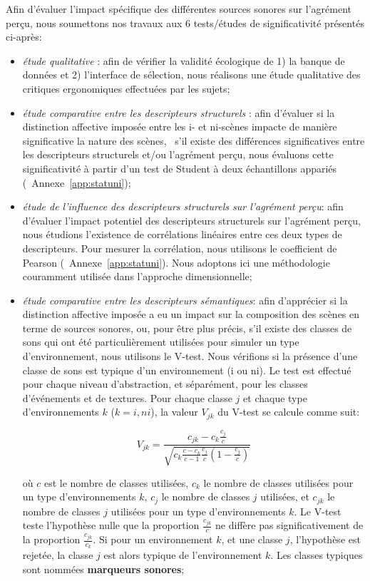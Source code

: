 Afin d'évaluer l'impact spécifique des différentes sources sonores sur l'agrément perçu, nous soumettons nos travaux aux 6 tests/études de significativité présentés ci-après:

\begin{itemize}
\item \emph{étude qualitative} : afin de vérifier la validité écologique de 1) la banque de données et 2) l'interface de sélection, nous réalisons une étude qualitative des critiques ergonomiques effectuées par les sujets;
\item \emph{étude comparative entre les descripteurs structurels} : afin d'évaluer si la distinction affective imposée entre les i- et ni-scènes impacte de manière significative la nature des scènes, \ie~s'il existe des différences significatives entre les descripteurs structurels et/ou l'agrément perçu, nous évaluons cette significativité à partir d'un test de Student à deux échantillons appariés (\cf~Annexe~\ref{app:statuni});
\item \emph{étude de l'influence des descripteurs structurels sur l'agrément perçu}: afin d'évaluer l'impact potentiel des descripteurs structurels sur l'agrément perçu, nous étudions l'existence de corrélations linéaires entre ces deux types de descripteurs. Pour mesurer la corrélation, nous utilisons le coefficient de Pearson (\cf~Annexe~\ref{app:statuni}). Nous adoptons ici une méthodologie couramment utilisée dans l'approche dimensionnelle;
\item \emph{étude comparative entre les descripteurs sémantiques}: afin d'apprécier si la distinction affective imposée a eu un impact sur la composition des scènes en terme de sources sonores, ou, pour être plus précis, s'il existe des classes de sons qui ont été particulièrement utilisées pour simuler un type d'environnement, nous utilisons le V-test. Nous vérifions si la présence d'une classe de sons est typique d'un environnement (i ou ni). Le test est effectué pour chaque niveau d'abstraction, et séparément, pour les classes d'événements et de textures. Pour chaque classe $j$ et chaque type d'environnements $k$ ($k={i,ni}$), la valeur $V_{jk}$ du V-test se calcule comme suit: 

\begin{equation*}
V_{jk}=\dfrac{c_{jk}-c_k\frac{c_j}{c}}{\sqrt{c_k\frac{c-c_k}{c-1}\frac{c_j}{c}(1-\frac{c_j}{c})}}
\end{equation*}

où $c$ est le nombre de classes utilisées, $c_k$ le nombre de classes utilisées pour un type d'environnements $k$, $c_j$ le nombre de classes $j$ utilisées, et $c_{jk}$ le nombre de classes $j$ utilisées pour un type d'environnements $k$. Le V-test teste l'hypothèse nulle que la proportion $\frac{c_{jk}}{c}$ ne diffère pas significativement de la proportion $\frac{c_{jk}}{c_k}$. Si pour un environnement $k$, et une classe $j$, l'hypothèse est rejetée, la classe $j$ est alors typique de l'environnement $k$. Les classes typiques sont nommées \textbf{marqueurs sonores};


\end{itemize}
